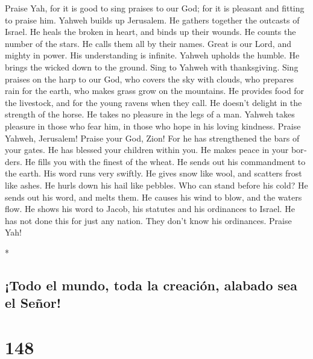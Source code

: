 \begin{paracol}{2}
\begin{otherlanguage}{english}
 Praise Yah, for it is good to sing praises to our God;
for it is pleasant and fitting to praise him.  Yahweh
builds up Jerusalem. He gathers together the outcasts of Israel.
 He heals the broken in heart, and binds up their wounds.
 He counts the number of the stars. He calls them all by
their names.  Great is our Lord, and mighty in power. His
understanding is infinite.  Yahweh upholds the humble. He
brings the wicked down to the ground.  Sing to Yahweh with
thanksgiving. Sing praises on the harp to our God,  who
covers the sky with clouds, who prepares rain for the earth, who makes
grass grow on the mountains.  He provides food for the
livestock, and for the young ravens when they call.  He
doesn't delight in the strength of the horse. He takes no pleasure in
the legs of a man.  Yahweh takes pleasure in those who
fear him, in those who hope in his loving kindness. 
Praise Yahweh, Jerusalem! Praise your God, Zion!  For he
has strengthened the bars of your gates. He has blessed your children
within you.  He makes peace in your borders. He fills you
with the finest of the wheat.  He sends out his
commandment to the earth. His word runs very swiftly.  He
gives snow like wool, and scatters frost like ashes.  He
hurls down his hail like pebbles. Who can stand before his cold?
 He sends out his word, and melts them. He causes his
wind to blow, and the waters flow.  He shows his word to
Jacob, his statutes and his ordinances to Israel.  He has
not done this for just any nation. They don't know his ordinances.
Praise Yah!

\end{otherlanguage}

\switchcolumn[0]*

\hypertarget{todo-el-mundo-toda-la-creaciuxf3n-alabado-sea-el-seuxf1or}{%
\subsection{¡Todo el mundo, toda la creación, alabado sea el
Señor!}\label{todo-el-mundo-toda-la-creaciuxf3n-alabado-sea-el-seuxf1or}}

\hypertarget{section-294}{%
\section{148}\label{section-294}}


\end{paracol}
